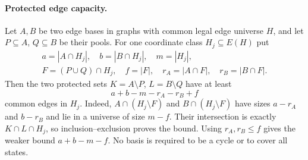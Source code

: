 \paragraph{Protected edge capacity.}
Let $A,B$ be two edge bases in graphs with common legal edge universe
$H$, and let $P\subseteq A$, $Q\subseteq B$ be their pools. For one
coordinate class $H_j\subseteq E(H)$ put
\[
\begin{gathered}
a=|A\cap H_j|,\quad b=|B\cap H_j|,\quad m=|H_j|,\\
F=(P\cup Q)\cap H_j,\quad f=|F|,\quad
r_A=|A\cap F|,\quad r_B=|B\cap F|.
\end{gathered}
\]
Then the two protected sets $K=A\setminus P$, $L=B\setminus Q$
have at least
\[
 a+b-m-r_A-r_B+f
\]
common edges in $H_j$. Indeed, $A\cap(H_j\setminus F)$ and
$B\cap(H_j\setminus F)$ have sizes $a-r_A$ and $b-r_B$ and lie in
a universe of size $m-f$. Their intersection is exactly
$K\cap L\cap H_j$, so inclusion--exclusion proves the bound.
Using $r_A,r_B\le f$ gives the weaker bound $a+b-m-f$.
No basis is required to be a cycle or to cover all states.

